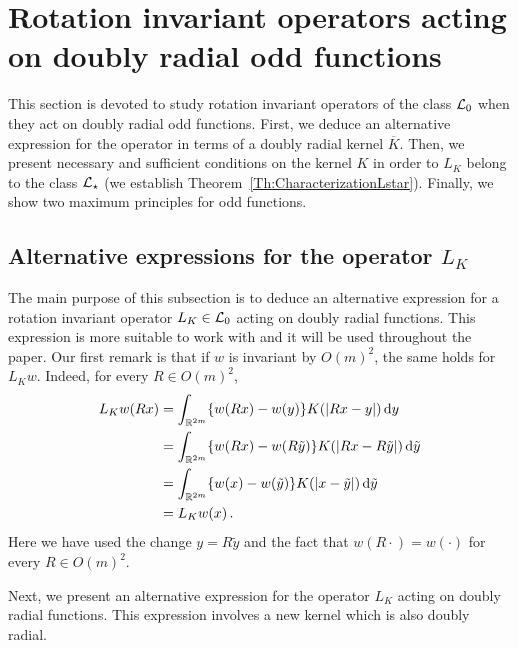\section{Rotation invariant operators acting on doubly radial odd functions}
\label{Sec:OperatorOddF}

This section is devoted to study rotation invariant operators of the class $\mathcal{L}_0$ when they act on doubly radial odd functions. First, we deduce an alternative expression for the operator in terms of a doubly radial kernel $\overline{K}$. Then, we present necessary and sufficient conditions on the kernel $K$ in order to $L_K$ belong to the class $\mathcal{L}_\star$ (we establish Theorem~\ref{Th:CharacterizationLstar}). Finally, we show two maximum principles for odd functions.


\subsection{Alternative expressions for the operator $L_K$}

The main purpose of this subsection is to deduce an alternative expression for a rotation invariant operator $L_K \in \mathcal{L}_0$ acting on doubly radial functions. This expression is more suitable to work with and it will be used throughout the paper. Our first remark is that if $w$ is invariant by $O(m)^2$, the same holds for $L_Kw$. Indeed, for every $R \in O(m)^2$,
\begin{align*}
L_K w (Rx)
& = \int_{\mathbb{R}^{2m}} \{w(Rx) - w(y)\} K(|Rx - y|)  \,\mathrm{d} y\\
& = \int_{\mathbb{R}^{2m}} \{w(Rx) - w(R\tilde{y})\} K(|Rx - R\tilde{y}|) \,\mathrm{d} \tilde{y}\\
& = \int_{\mathbb{R}^{2m}} \{w(x) - w(\tilde{y})\} K(|x-\tilde{y}|) \,\mathrm{d} \tilde{y}\\
& = L_K w (x)\,.
\end{align*}
Here we have used the change $y = R\tilde{y}$ and the fact that $w(R \cdot) = w(\cdot)$ for every $R\in O(m)^2$.

Next, we present an alternative expression for the operator $L_K $ acting on doubly radial functions. This expression involves a new kernel which is also doubly radial.


